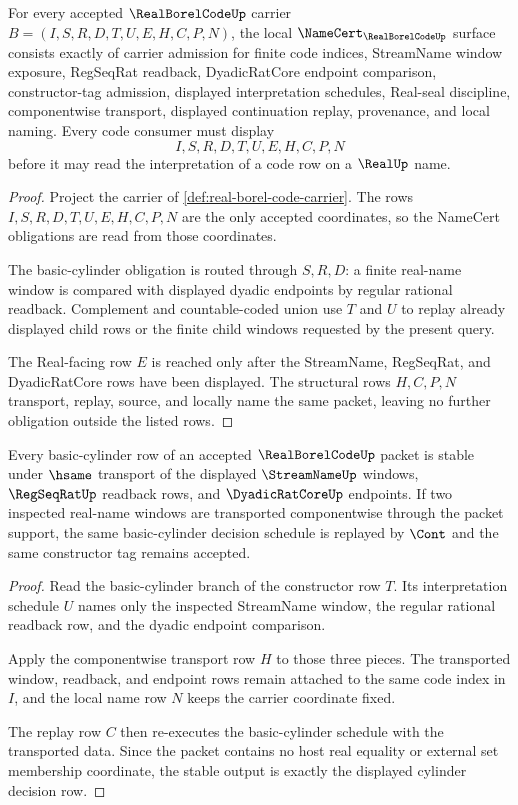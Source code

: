 \begin{theorem}
\label{thm:real-borel-code-namecert-obligations}
For every accepted $\RealBorelCodeUp$ carrier $B=(I,S,R,D,T,U,E,H,C,P,N)$, the local $\NameCert_{\RealBorelCodeUp}$ surface consists exactly of carrier admission for finite code indices, StreamName window exposure, RegSeqRat readback, DyadicRatCore endpoint comparison, constructor-tag admission, displayed interpretation schedules, Real-seal discipline, componentwise transport, displayed continuation replay, provenance, and local naming. Every code consumer must display
$$
I,S,R,D,T,U,E,H,C,P,N
$$
before it may read the interpretation of a code row on a $\RealUp$ name.
\end{theorem}
\begin{proof}
Project the carrier of \autoref{def:real-borel-code-carrier}. The rows $I,S,R,D,T,U,E,H,C,P,N$ are the only accepted coordinates, so the NameCert obligations are read from those coordinates.

The basic-cylinder obligation is routed through $S,R,D$: a finite real-name window is compared with displayed dyadic endpoints by regular rational readback. Complement and countable-coded union use $T$ and $U$ to replay already displayed child rows or the finite child windows requested by the present query.

The Real-facing row $E$ is reached only after the StreamName, RegSeqRat, and DyadicRatCore rows have been displayed. The structural rows $H,C,P,N$ transport, replay, source, and locally name the same packet, leaving no further obligation outside the listed rows.
\end{proof}

\begin{theorem}
\label{thm:real-borel-code-cylinder-stability}
Every basic-cylinder row of an accepted $\RealBorelCodeUp$ packet is stable under $\hsame$ transport of the displayed $\StreamNameUp$ windows, $\RegSeqRatUp$ readback rows, and $\DyadicRatCoreUp$ endpoints. If two inspected real-name windows are transported componentwise through the packet support, the same basic-cylinder decision schedule is replayed by $\Cont$ and the same constructor tag remains accepted.
\end{theorem}
\begin{proof}
Read the basic-cylinder branch of the constructor row $T$. Its interpretation schedule $U$ names only the inspected StreamName window, the regular rational readback row, and the dyadic endpoint comparison.

Apply the componentwise transport row $H$ to those three pieces. The transported window, readback, and endpoint rows remain attached to the same code index in $I$, and the local name row $N$ keeps the carrier coordinate fixed.

The replay row $C$ then re-executes the basic-cylinder schedule with the transported data. Since the packet contains no host real equality or external set membership coordinate, the stable output is exactly the displayed cylinder decision row.
\end{proof}

